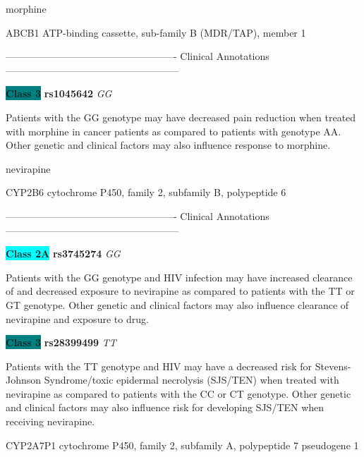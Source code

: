 \documentclass{resume} %
\begin{document}
\begin{rSection}{ morphine }
\begin{rSubsection}{ ABCB1 }{ ATP-binding cassette, sub-family B (MDR/TAP), member 1 }{}{}
\item[]

\item[] ---------------------------------------------------- Clinical Annotations -----------------------------------------------------\newline
\item \textbf{\colorbox{teal} {Class 3}} \textbf{ rs1045642 } \textit{ GG }
\item[] Patients with the GG genotype may have decreased pain reduction when treated with morphine in cancer patients as compared to patients with genotype AA. Other genetic and clinical factors may also influence response to morphine.
\end{rSubsection}

\end{rSection}\begin{rSection}{ nevirapine }
\item[]

\begin{rSubsection}{ CYP2B6 }{ cytochrome P450, family 2, subfamily B, polypeptide 6 }{}{}
\item[]

\item[] ---------------------------------------------------- Clinical Annotations -----------------------------------------------------\newline
\item \textbf{\colorbox{cyan} {Class 2A}} \textbf{ rs3745274 } \textit{ GG }
\item[] Patients with the GG genotype and HIV infection may have increased clearance of and decreased exposure to nevirapine as compared to patients with the TT or GT genotype. Other genetic and clinical factors may also influence clearance of nevirapine and exposure to drug.\item \textbf{\colorbox{teal} {Class 3}} \textbf{ rs28399499 } \textit{ TT }
\item[] Patients with the TT genotype and HIV may have a decreased risk for Stevens-Johnson Syndrome/toxic epidermal necrolysis (SJS/TEN) when treated with nevirapine as compared to patients with the CC or CT genotype. Other genetic and clinical factors may also influence risk for developing SJS/TEN when receiving nevirapine.
\end{rSubsection}\begin{rSubsection}{ CYP2A7P1 }{ cytochrome P450, family 2, subfamily A, polypeptide 7 pseudogene 1 }{}{}
\item[]


\end{rSubsection}
\end{rSection}
\end{document}
